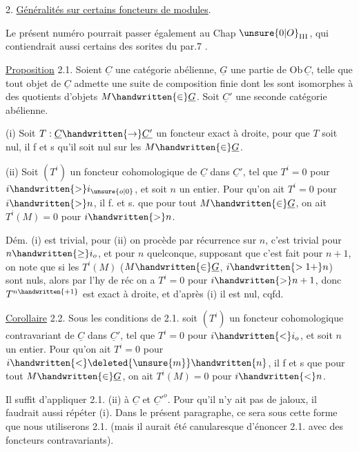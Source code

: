 2. \uline{Généralités sur certains foncteurs de modules}.

Le présent numéro pourrait passer également au  Chap $\unsure{0|O}_{\mathrm{III}}$, qui contiendrait aussi certains des sorites du par.7 .

\uline{Proposition} 2.1. Soient $\underline C$ une catégorie abélienne, $\underline G$ une partie de $\mathrm{Ob}\,\underline C$, telle que tout objet de $\underline C$ admette une suite de composition finie dont les  sont isomorphes à des quotients d'objets $M\handwritten{\in}\underline G$.  Soit $\underline C'$ une seconde catégorie abélienne.

(i) Soit $T:\underline C\handwritten{\to}\underline{C'}$ un foncteur  exact à droite, pour que $T$ soit nul, il f et s qu'il soit nul sur les $M\handwritten{\in}\underline G$.

(ii) Soit $(T^i)$ un foncteur cohomologique de $\underline C$ dans $\underline C'$, tel que $T^i=0$ pour $i\handwritten{>}i_{\unsure{o|0}}$, et soit $n$ un entier. Pour qu'on ait $T^i=0$ pour $i\handwritten{>}n$, il f. et s. que pour tout $M\handwritten{\in}\underline G$, on ait $T^i(M)=0$ pour $i\handwritten{>}n$.

Dém. (i) est trivial, pour (ii) on procède par récurrence  sur $n$, c'est trivial pour $n\handwritten{\geq}i_o$, et pour $n$ quelconque, supposant que c'est fait pour $n+1$, on note que si les $T^i(M)$ ($M\handwritten{\in}\underline G$, $i\handwritten{>1+}n$) sont nuls, alors par l'hy de réc on a $T^i=0$ pour $i\handwritten{>}n+1$, donc $T^{n\handwritten{+1}}$ est exact à droite, et d'après (i) il est nul, cqfd.

\uline{Corollaire} 2.2. Sous les conditions de 2.1. soit $(T^i)$ un foncteur cohomologique contravariant de $\underline C$ dans $\underline C'$, tel que $T^i=0$ pour $i\handwritten{<}i_o$, et soit $n$ un entier. Pour qu'on ait $T^i=0$ pour $i\handwritten{<}\deleted{\unsure{m}}\handwritten{n}$, il f et s que pour tout $M\handwritten{\in}\underline G$, on ait $T^i(M)=0$ pour $i\handwritten{<}n$.

Il suffit d'appliquer 2.1. (ii) à $\underline C$ et ${\underline C'}^{o}$. Pour qu'il n'y ait pas de jaloux, il faudrait aussi répéter (i). Dans le présent paragraphe, ce sera sous cette forme que nous utiliserons 2.1. (mais il aurait été canularesque d'énoncer 2.1. avec des foncteurs contravariants).

